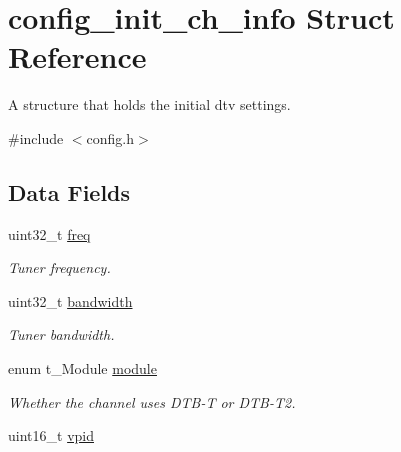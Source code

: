 \hypertarget{structconfig__init__ch__info}{}\section{config\+\_\+init\+\_\+ch\+\_\+info Struct Reference}
\label{structconfig__init__ch__info}


A structure that holds the initial dtv settings.  




{\ttfamily \#include $<$config.\+h$>$}

\subsection*{Data Fields}
\begin{DoxyCompactItemize}
\item 
uint32\+\_\+t \hyperlink{structconfig__init__ch__info_a7ed0d2ed7ee4b93dc7aa79ee51b06250}{freq}\hypertarget{structconfig__init__ch__info_a7ed0d2ed7ee4b93dc7aa79ee51b06250}{}\label{structconfig__init__ch__info_a7ed0d2ed7ee4b93dc7aa79ee51b06250}

\begin{DoxyCompactList}\small\item\em Tuner frequency. \end{DoxyCompactList}\item 
uint32\+\_\+t \hyperlink{structconfig__init__ch__info_abe594b5e1173acfccae5d1cbfd358630}{bandwidth}\hypertarget{structconfig__init__ch__info_abe594b5e1173acfccae5d1cbfd358630}{}\label{structconfig__init__ch__info_abe594b5e1173acfccae5d1cbfd358630}

\begin{DoxyCompactList}\small\item\em Tuner bandwidth. \end{DoxyCompactList}\item 
enum t\+\_\+\+Module \hyperlink{structconfig__init__ch__info_a0853c4a90403d73518f4c8625befcfbd}{module}\hypertarget{structconfig__init__ch__info_a0853c4a90403d73518f4c8625befcfbd}{}\label{structconfig__init__ch__info_a0853c4a90403d73518f4c8625befcfbd}

\begin{DoxyCompactList}\small\item\em Whether the channel uses D\+T\+B-\/T or D\+T\+B-\/\+T2. \end{DoxyCompactList}\item 
uint16\+\_\+t \hyperlink{structconfig__init__ch__info_a5aaaa11fa8a60ddaf54696ae2bee5fcc}{vpid}\hypertarget{structconfig__init__ch__info_a5aaaa11fa8a60ddaf54696ae2bee5fcc}{}\label{structconfig__init__ch__info_a5aaaa11fa8a60ddaf54696ae2bee5fcc}


\end{DoxyCompactItemize}
